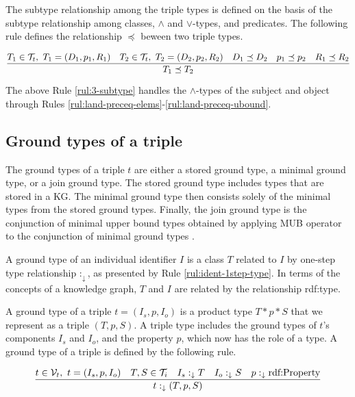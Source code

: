 \documentclass[runningheads]{llncs}
\newcommand{\darr}{\downarrow}
\newcommand{\V}{{\cal V}}
\newcommand{\T}{{\cal T}}
\begin{document}
The subtype relationship among the triple types is defined on the
basis of the subtype relationship among classes, $\land$ and
$\lor$-types, and predicates. The following rule defines the
relationship $\preceq$ beween two triple types.

\begin{equation}
\label{rul:3-subtype}
\dfrac{T_1\in\T_t,\ T_1=(D_1,p_1,R_1)\quad T_2\in\T_t,\ T_2=(D_2,p_2,R_2)\quad\/D_1\preceq\/D_2\quad\/p_1\preceq\/p_2\quad\/R_1\preceq\/R_2}
      {T_1\preceq\/T_2}
\end{equation}

\noindent
The above Rule \ref{rul:3-subtype} handles the $\land$-types of the
subject and object through Rules
\ref{rul:land-preceq-elems}-\ref{rul:land-preceq-ubound}.







\subsection{Ground types of a triple\label{sec:3-ground-types}}

\noindent
The ground types of a triple $t$ are either a stored ground type, a
minimal ground type, or a join ground type. The stored ground type
includes types that are stored in a KG. The minimal ground type then
consists solely of the minimal types from the stored ground
types. Finally, the join ground type is the conjunction of minimal
upper bound types obtained by applying MUB operator to the conjunction
of minimal ground types \cite{Knudstorp2024}.
 
A ground type of an individual identifier $I$ is a class $T$ related
to $I$ by one-step type relationship $:_\darr$, as presented by Rule
\ref{rul:ident-1step-type}. In terms of the concepts of a knowledge
graph, $T$ and $I$ are related by the relationship rdf:type.

A ground type of a triple $t=(I_s,p,I_o)$ is a product type
$T*p*S$ that we represent as a triple $(T,p,S)$. A triple type
includes the ground types of $t$'s components $I_s$ and $I_o$, and the
property $p$, which now has the role of a type. A ground type of a
triple is defined by the following rule.

\begin{equation}
\label{rul:3-ground}
\dfrac{t\in\V_t,\ t=(I_s,p,I_o)\quad T,S\in\T_i\quad I_s:_\darr\/T\quad I_o:_\darr\/S\quad p:_\darr\text{rdf:Property}}
      {t:_\darr(T,p,S)}
\end{equation}
\end{document}
